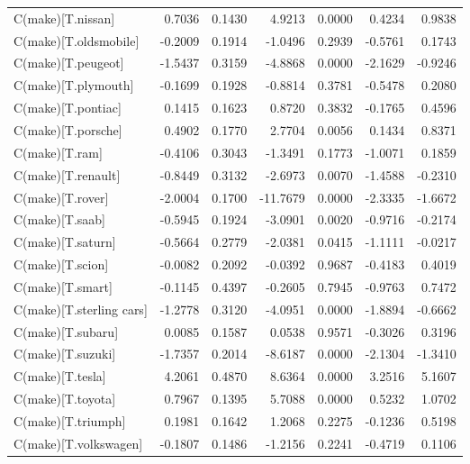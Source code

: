 \begin{table}
\begin{center}
\begin{tabular}{lrrrrrr}
C(make)[T.nissan]        &  0.7036 &   0.1430 &   4.9213 &      0.0000 &  0.4234 &  0.9838  \\
C(make)[T.oldsmobile]    & -0.2009 &   0.1914 &  -1.0496 &      0.2939 & -0.5761 &  0.1743  \\
C(make)[T.peugeot]       & -1.5437 &   0.3159 &  -4.8868 &      0.0000 & -2.1629 & -0.9246  \\
C(make)[T.plymouth]      & -0.1699 &   0.1928 &  -0.8814 &      0.3781 & -0.5478 &  0.2080  \\
C(make)[T.pontiac]       &  0.1415 &   0.1623 &   0.8720 &      0.3832 & -0.1765 &  0.4596  \\
C(make)[T.porsche]       &  0.4902 &   0.1770 &   2.7704 &      0.0056 &  0.1434 &  0.8371  \\
C(make)[T.ram]           & -0.4106 &   0.3043 &  -1.3491 &      0.1773 & -1.0071 &  0.1859  \\
C(make)[T.renault]       & -0.8449 &   0.3132 &  -2.6973 &      0.0070 & -1.4588 & -0.2310  \\
C(make)[T.rover]         & -2.0004 &   0.1700 & -11.7679 &      0.0000 & -2.3335 & -1.6672  \\
C(make)[T.saab]          & -0.5945 &   0.1924 &  -3.0901 &      0.0020 & -0.9716 & -0.2174  \\
C(make)[T.saturn]        & -0.5664 &   0.2779 &  -2.0381 &      0.0415 & -1.1111 & -0.0217  \\
C(make)[T.scion]         & -0.0082 &   0.2092 &  -0.0392 &      0.9687 & -0.4183 &  0.4019  \\
C(make)[T.smart]         & -0.1145 &   0.4397 &  -0.2605 &      0.7945 & -0.9763 &  0.7472  \\
C(make)[T.sterling cars] & -1.2778 &   0.3120 &  -4.0951 &      0.0000 & -1.8894 & -0.6662  \\
C(make)[T.subaru]        &  0.0085 &   0.1587 &   0.0538 &      0.9571 & -0.3026 &  0.3196  \\
C(make)[T.suzuki]        & -1.7357 &   0.2014 &  -8.6187 &      0.0000 & -2.1304 & -1.3410  \\
C(make)[T.tesla]         &  4.2061 &   0.4870 &   8.6364 &      0.0000 &  3.2516 &  5.1607  \\
C(make)[T.toyota]        &  0.7967 &   0.1395 &   5.7088 &      0.0000 &  0.5232 &  1.0702  \\
C(make)[T.triumph]       &  0.1981 &   0.1642 &   1.2068 &      0.2275 & -0.1236 &  0.5198  \\
C(make)[T.volkswagen]    & -0.1807 &   0.1486 &  -1.2156 &      0.2241 & -0.4719 &  0.1106  \\

\end{tabular}
\end{center}
\end{table}
